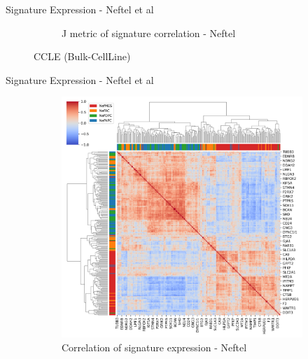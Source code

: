 \documentclass[aspectratio=169,9pt]{beamer}
\begin{document}
\begin{frame}{Signature Expression - Neftel et al}
\begin{adjustwidth}{-5cm}{-5cm}
\begin{figure}
\begin{subfigure}[c]{0.4\textwidth}
                    \caption{J metric of signature correlation - Neftel}
                \end{subfigure}
                \caption{CCLE (Bulk-CellLine)}
            \end{figure}
        \end{adjustwidth}
    \end{frame}

    \begin{frame}{Signature Expression - Neftel et al}
        \begin{adjustwidth}{-5cm}{-5cm}
            \centering
            \begin{figure}\ContinuedFloat
                \centering
                \begin{subfigure}[c]{0.48\textwidth}
                    \centering
                    \includegraphics[width=\textwidth]{TCGA_Corrplot_Nef}
                    \caption{Correlation of signature expression - Neftel}
                \end{subfigure}
                \begin{subfigure}[c]{0.4\textwidth}
                    \centering

\end{subfigure}
\end{figure}
\end{adjustwidth}
\end{frame}
\end{document}
